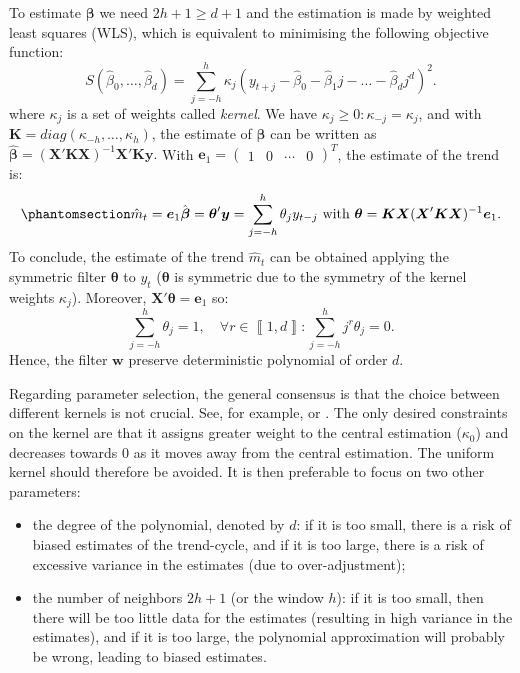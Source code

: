 \documentclass[
]{article}
\newcommand\transp[1]{{#1}^T}
\newcommand\1{\mathds{1}}
\begin{document}
To estimate \(\boldsymbol \beta\) we need \(2h+1\geq d+1\) and the
estimation is made by weighted least squares (WLS), which is equivalent
to minimising the following objective function: \[
S(\hat{\beta}_{0},\dots,\hat{\beta}_{d})=\sum_{j=-h}^{h}\kappa_{j}(y_{t+j}-\hat{\beta}_{0}-\hat{\beta}_{1}j-\dots-\hat{\beta}_{d}j^{d})^{2}.
\] where \(\kappa_j\) is a set of weights called \emph{kernel}. We have
\(\kappa_j\geq 0:\kappa_{-j}=\kappa_j\), and with
\(\boldsymbol K=diag(\kappa_{-h},\dots,\kappa_{h})\), the estimate of
\(\boldsymbol \beta\) can be written as
\(\hat{\boldsymbol\beta}=(\boldsymbol X'\boldsymbol K\boldsymbol X)^{-1}\boldsymbol X'\boldsymbol K\boldsymbol y.\)
With
\(\boldsymbol e_1=\transp{\begin{pmatrix}1 &0 &\cdots&0 \end{pmatrix}}\),
the estimate of the trend is:
\begin{equation}\phantomsection\label{eq-mmsym}{
\hat{m}_{t}=\boldsymbol e_{1}\hat{\boldsymbol \beta}=\boldsymbol \theta'\boldsymbol y=\sum_{j=-h}^{h}\theta_{j}y_{t-j}\text{ with }\boldsymbol \theta=\boldsymbol K\boldsymbol X(\boldsymbol X'\boldsymbol K\boldsymbol X)^{-1}\boldsymbol e_{1}.
}\end{equation} To conclude, the estimate of the trend \(\hat{m}_{t}\)
can be obtained applying the symmetric filter \(\boldsymbol \theta\) to
\(y_t\) (\(\boldsymbol \theta\) is symmetric due to the symmetry of the
kernel weights \(\kappa_j\)). Moreover,
\(\boldsymbol X'\boldsymbol \theta=\boldsymbol e_{1}\) so: \[
\sum_{j=-h}^{h}\theta_{j}=1,\quad\forall r\in\left\llbracket 1,d\right\rrbracket:\sum_{j=-h}^{h}j^{r}\theta_{j}=0.
\] Hence, the filter \(\boldsymbol w\) preserve deterministic polynomial
of order \(d\).

Regarding parameter selection, the general consensus is that the choice
between different kernels is not crucial. See, for example,
\textcite{cleveland1996smoothing} or \textcite{Loader1999}. The only
desired constraints on the kernel are that it assigns greater weight to
the central estimation (\(\kappa_0\)) and decreases towards 0 as it
moves away from the central estimation. The uniform kernel should
therefore be avoided. It is then preferable to focus on two other
parameters:

\begin{itemize}
\item
  the degree of the polynomial, denoted by \(d\): if it is too small,
  there is a risk of biased estimates of the trend-cycle, and if it is
  too large, there is a risk of excessive variance in the estimates (due
  to over-adjustment);
\item
  the number of neighbors \(2h+1\) (or the window \(h\)): if it is too
  small, then there will be too little data for the estimates (resulting
  in high variance in the estimates), and if it is too large, the
  polynomial approximation will probably be wrong, leading to biased
  estimates.
\end{itemize}
\end{document}
